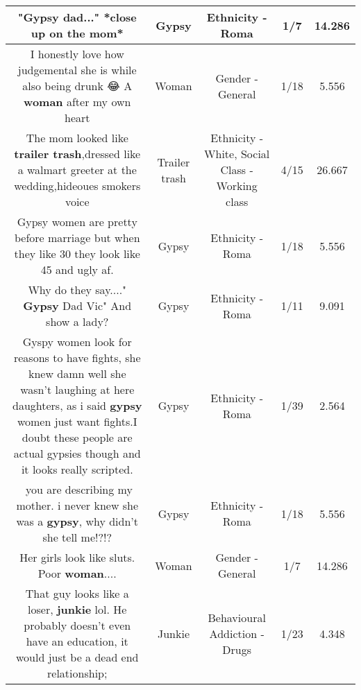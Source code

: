 \documentclass[11pt]{article}
\newlength\mylength
\begin{document}
\begin{center}
\begin{longtable}{|C{.65\mylength}|C{.30\mylength}|C{.12\mylength}|C{.12\mylength}|C{.12\mylength}|}
  \small "\textbf{Gypsy} dad..." *close up on the mom*\normalsize   & Gypsy & Ethnicity - Roma & 1/7 & 14.286 \\  \hline
  \small I honestly love how judgemental she is while also being drunk 😂 A \textbf{woman} after my own heart\normalsize   & Woman & Gender - General & 1/18 & 5.556 \\  \hline
  \small The mom looked like \textbf{t\textbf{railer trash}},dressed like a walmart greeter at the wedding,hideoues smokers voice\normalsize   & Trailer trash & Ethnicity - White, Social Class - Working class & 4/15 & 26.667 \\  \hline
  \small Gypsy women are pretty before marriage but when they like 30 they look like 45 and ugly af.\normalsize   & Gypsy & Ethnicity - Roma & 1/18 & 5.556 \\  \hline
  \small Why do they say...." \textbf{Gypsy} Dad Vic" And show a lady?\normalsize   & Gypsy & Ethnicity - Roma & 1/11 & 9.091 \\  \hline
  \small Gyspy women look for reasons to have fights, she knew damn well she wasn't laughing at here daughters, as i said \textbf{gypsy} women just want fights.I doubt these people are actual gypsies though and it looks really scripted.\normalsize   & Gypsy & Ethnicity - Roma & 1/39 & 2.564 \\  \hline
  \small ​ you are describing my mother. i never knew she was a \textbf{gypsy}, why didn't she tell me!?!?\normalsize   & Gypsy & Ethnicity - Roma & 1/18 & 5.556 \\  \hline
  \small Her girls look like sluts. Poor \textbf{woman}....\normalsize   & Woman & Gender - General & 1/7 & 14.286 \\  \hline
  \small That guy looks like a loser, \textbf{junkie} lol. He probably doesn't even have an education, it would just be a dead end relationship;\normalsize   & Junkie & Behavioural Addiction - Drugs & 1/23 & 4.348 \\  \hline

\end{longtable}
\end{center}
\end{document}
